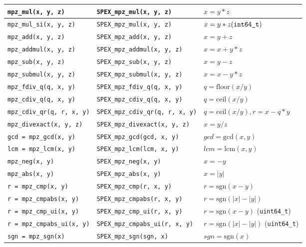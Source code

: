 \documentclass[12pt]{report}
\theoremstyle{definition}
\begin{document}
{\begin{center}
\begin{tabular}{|l|l|l|}
\verb|mpz_mul(x, y, z)|
    & \verb|SPEX_mpz_mul(x, y, z)|
    & $x = y*z$ \\ \hline
\verb|mpz_mul_si(x, y, z)|
    & \verb|SPEX_mpz_mul(x, y, z)|
    & $x = y*z (\verb|int64_t|)$ \\ \hline
\verb|mpz_add(x, y, z)|
    & \verb|SPEX_mpz_add(x, y, z)|
    & $x = y+z$ \\ \hline
\verb|mpz_addmul(x, y, z)|
    & \verb|SPEX_mpz_addmul(x, y, z)|
    & $x = x+y*z$ \\ \hline
\verb|mpz_sub(x, y, z)|
    & \verb|SPEX_mpz_sub(x, y, z)|
    & $x = y-z$ \\ \hline
\verb|mpz_submul(x, y, z)|
    & \verb|SPEX_mpz_submul(x, y, z)|
    & $x = x-y*z$ \\ \hline
\verb|mpz_fdiv_q(q, x, y)|
    & \verb|SPEX_mpz_fdiv_q(q, x, y)|
    & $q = \text{floor}(x/y)$ \\ \hline
\verb|mpz_cdiv_q(q, x, y)|
    & \verb|SPEX_mpz_cdiv_q(q, x, y)|
    & $q = \text{ceil}(x/y)$ \\ \hline
\verb|mpz_cdiv_qr(q, r, x, y)|
    & \verb|SPEX_mpz_cdiv_qr(q, r, x, y)|
    & $q = \text{ceil}(x/y), r = x-q*y$ \\ \hline
\verb|mpz_divexact(x, y, z)|
    & \verb|SPEX_mpz_divexact(x, y, z)|
    & $x = y/z$ \\ \hline
\verb|gcd = mpz_gcd(x, y)|
    & \verb|SPEX_mpz_gcd(gcd, x, y)|
    & $gcd = \text{gcd}(x,y)$\\ \hline
\verb|lcm = mpz_lcm(x, y)|
    & \verb|SPEX_mpz_lcm(lcm, x, y)|
    & $lcm = \text{lcm}(x,y)$ \\ \hline
\verb|mpz_neg(x, y)|
    & \verb|SPEX_mpz_neg(x, y)|
    & $x = -y$ \\ \hline
\verb|mpz_abs(x, y)|
    & \verb|SPEX_mpz_abs(x, y)|
    & $x = |y|$ \\ \hline
\verb|r = mpz_cmp(x, y)|
    & \verb|SPEX_mpz_cmp(r, x, y)|
    & $r = \text{sgn}(x-y)$ \\ \hline
\verb|r = mpz_cmpabs(x, y)|
    & \verb|SPEX_mpz_cmpabs(r, x, y)|
    & $r = \text{sgn}(|x|-|y|)$\\ \hline
\verb|r = mpz_cmp_ui(x, y)|
    & \verb|SPEX_mpz_cmp_ui(r, x, y)|
    & $r = \text{sgn}(x-y)$ (\verb|uint64_t|) \\ \hline
\verb|r = mpz_cmpabs_ui(x, y)|
    & \verb|SPEX_mpz_cmpabs_ui(r, x, y)|
    & $r = \text{sgn}(|x|-|y|)$ (\verb|uint64_t|) \\ \hline
\verb|sgn = mpz_sgn(x)|
    & \verb|SPEX_mpz_sgn(sgn, x)|
    & $sgn = \text{sgn}(x)$ \\ \hline

\end{tabular}
\end{center}}
\end{document}
